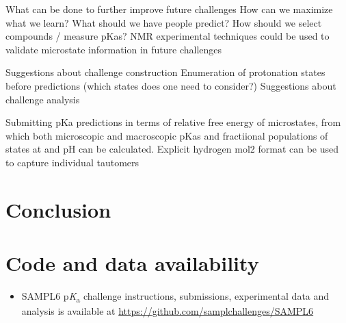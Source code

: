 \documentclass[9pt,lineno,final]{elife}
\newcommand{\pKa}{p\textit{K}\textsubscript{a}}
\begin{document}
What can be done to further improve future challenges
How can we maximize what we learn?
What should we have people predict?
How should we select compounds / measure pKas? NMR experimental techniques could be used to validate microstate information in future challenges

Suggestions about challenge construction
Enumeration of protonation states before predictions (which states does one need to consider?)
Suggestions about challenge analysis


Submitting pKa predictions in terms of relative free energy of microstates, from which both microscopic and macroscopic pKas and fractiional populations of states at and pH can be calculated.
Explicit hydrogen mol2 format can be used to capture individual tautomers















\section{Conclusion}


\section{Code and data availability} \label{Code-and-Data-Availability}
\begin{minipage}{15cm}
\begin{itemize}

\item SAMPL6 \pKa{} challenge instructions, submissions, experimental data and analysis is available at  \href{https://github.com/samplchallenges/SAMPL6}{https://github.com/samplchallenges/SAMPL6}

\end{itemize}
\end{minipage}


\end{document}
